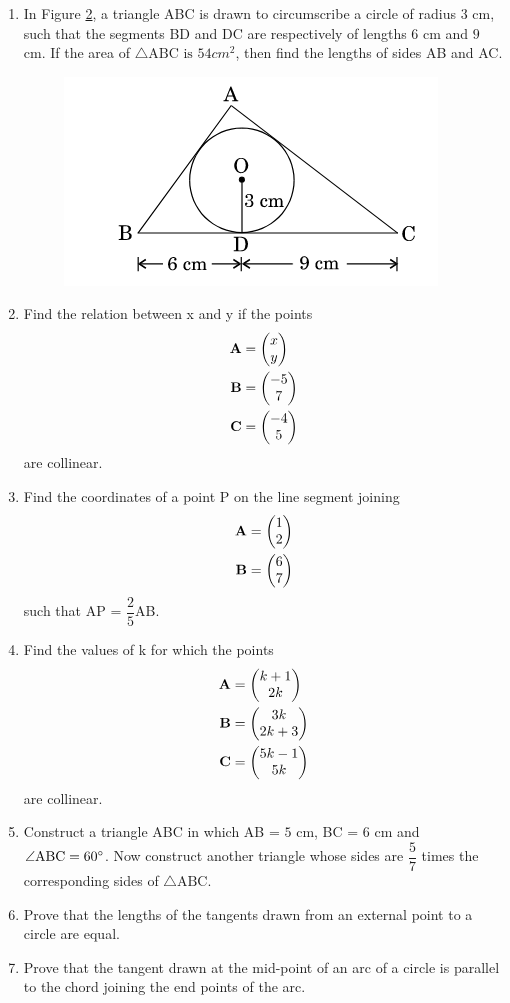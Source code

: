\documentclass[10pt,-letter paper]{article}
\begin{document}
\begin{enumerate}
\begin{figure}[h!]
	\caption{}
	\label{Figure 3}
\end{figure}
\item In Figure \ref{Figure 4}, a triangle ABC is drawn to circumscribe a circle of radius $3$ cm, such that the segments BD and DC are respectively of lengths $6$ cm  and $9$ cm. If the area of $\triangle \text{ABC is }54 cm^2$, then find the lengths of sides AB and AC.
\begin{figure}[h!]
	\centering
    \includegraphics[width=0.5\columnwidth]{./figs/image4.png}
	\caption{}
	\label{Figure 4}
\end{figure}
\item Find the relation between x and y if the points 
\begin{align*}
\mathbf{A}&=\begin{pmatrix}x \\ y\end{pmatrix}\\ 
\mathbf{B}&=\begin{pmatrix}-5\\7\end{pmatrix}\\
\mathbf{C}&=\begin{pmatrix}-4\\5\end{pmatrix} 
\end{align*}
are collinear.
\item Find the coordinates of a point P on the line segment joining
\begin{align*}
\mathbf{A} &= \begin{pmatrix}1\\2\end{pmatrix}\\
\mathbf{B} &= \begin{pmatrix}6\\7\end{pmatrix}
\end{align*}
such that AP = $\dfrac{2}{5}$AB.
\item Find the values of k for which the points
\begin{align*}
\mathbf{A} &= \begin{pmatrix}k+1\\2k\end{pmatrix}\\
\mathbf{B} &= \begin{pmatrix}3k\\2k+3\end{pmatrix}\\
\mathbf{C} &= \begin{pmatrix}5k-1\\5k\end{pmatrix}
\end{align*}
are collinear.
\item Construct a triangle ABC in which AB = $5$ cm, BC = $6$ cm and $\angle \text{ABC} = 60\degree$. Now construct another triangle whose sides are $\dfrac{5}{7}$ times the corresponding sides of $\triangle \text{ABC}$.
\item Prove that the lengths of the tangents drawn from an external point to a circle are equal.
\item Prove that the tangent drawn at the mid-point of an arc of a circle is parallel to the chord joining the end points of the arc.



\end{enumerate}
\end{document}
